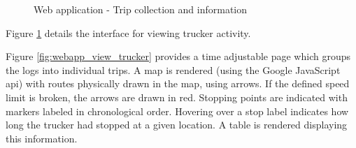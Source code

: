 \begin{figure}[H]
\centering
\caption{Web application - Trip collection and information}
\label{fig:webapp_trucker_details}
\end{figure}
Figure \ref{fig:webapp_trucker_details} details the interface for viewing trucker activity.

Figure \ref{fig:webapp_view_trucker} provides a time adjustable page which groups the logs into individual trips.
A map is rendered (using the Google JavaScript \Ac{api}) with routes physically drawn in the map, using arrows.
If the defined speed limit is broken, the arrows are drawn in red.
Stopping points are indicated with markers labeled in chronological order.
Hovering over a stop label indicates how long the trucker had stopped at a given location.
A table is rendered displaying this information.

